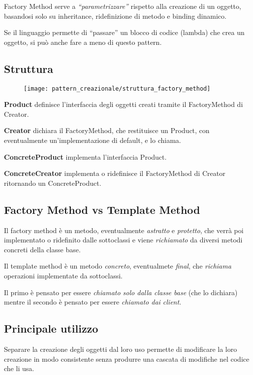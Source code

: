 Factory Method serve a \textit{“parametrizzare”} rispetto alla creazione di un oggetto, basandosi solo su inheritance, ridefinizione di metodo e binding dinamico.

Se il linguaggio permette di “passare” un blocco di codice (lambda) che crea un oggetto, si può anche fare a meno di questo pattern.

\subsection{Struttura}

\begin{figure}[H]
    \centering
    \texttt{[image: pattern\_creazionale/struttura\_factory\_method]}
\end{figure}

\textbf{Product} definisce l'interfaccia degli oggetti creati tramite il FactoryMethod di Creator.

\textbf{Creator} dichiara il FactoryMethod, che restituisce un Product, con eventualmente un'implementazione di default, e lo chiama.

\textbf{ConcreteProduct} implementa l'interfaccia Product.

\textbf{ConcreteCreator} implementa o ridefinisce il FactoryMethod di Creator ritornando un ConcreteProduct.

\subsection{Factory Method vs Template Method}

Il factory method è un metodo, eventualmente \textit{astratto} e \textit{protetto}, che verrà poi implementato o ridefinito dalle sottoclassi e viene 
\textit{richiamato} da diversi metodi concreti della classe base.

Il template method è un metodo \textit{concreto}, eventualmete \textit{final}, che \textit{richiama} operazioni implementate da sottoclassi.

Il primo è pensato per essere \textit{chiamato solo dalla classe base} (che lo dichiara) mentre il secondo è pensato per essere \textit{chiamato dai client}.

\subsection{Principale utilizzo}

Separare la creazione degli oggetti dal loro uso permette di modificare la loro creazione in modo consistente senza produrre una cascata di modifiche nel codice che 
li usa.

